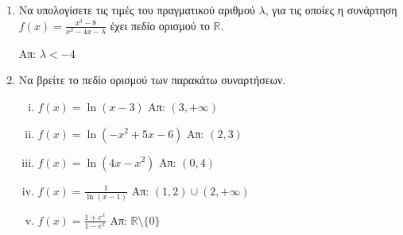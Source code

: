 \documentclass[a4paper,table]{report}
\begin{document}
\begin{enumerate}
    \twocolumnsidess{
      \begin{enumerate}[i)]
        \item $ f(x) = \sqrt{x-2} $ \hfill Απ: $[2,+\infty)$
        \item $ f(x) = \sqrt{4-x} -3x \sqrt{x+2} $ \hfill Απ: $ [-2,4] $ 
        \item $ f(x) = \sqrt{x^{2}-2x-3} $ \hfill Απ: $ (-\infty,-1] 
          \cup [3,+\infty) $  
        \item $ f(x) = \frac{\sqrt{x+3}}{x+1} $ \hfill Απ: 
          $ [-3,-1) \cup (-1,+\infty)  $ 
    \end{enumerate}}{
      \begin{enumerate}[i)]
        \item $ f(x) = \frac{\sqrt{x-2}}{\sqrt{x-3}} $ \hfill Απ:
          $ ( 3, +\infty ) $  
        \item $ f(x) = \frac{\sqrt{\abs{x}-2}}{x-3} $ \hfill 
          Απ: $ ( -\infty, -2 ] \cup [2,3) \cup (3,+\infty) $ 
        \item $ f(x) = \frac{\sqrt{\abs{x}-x}}{\abs{x}-2} $ \hfill Απ: 
          $ (-\infty,-2) \cup (-2,0] $
    \end{enumerate}
  }

    \item Να υπολογίσετε τις τιμές του πραγματικού αριθμού $ \lambda $, για τις 
      οποίες η συνάρτηση $ f(x) = \frac{x^{3}-8}{x^{2}-4x- \lambda} $ έχει πεδίο 
      ορισμού το $ \mathbb{R} $.

      \hfill Απ: $ \lambda < -4 $ 

    \item  Να βρείτε το πεδίο ορισμού των παρακάτω συναρτήσεων.
      \begin{enumerate}[i)]
        \item $ f(x) = \ln{(x-3)} $ \hfill Απ: $(3,+\infty)$
        \item $ f(x) = \ln{(-x^{2}+5x-6)} $ \hfill Απ: $ (2,3) $
        \item $ f(x) = \ln{(4x-x^{2})} $ \hfill Απ: $ (0,4) $
        \item $ f(x) = \frac{1}{\ln{(x-1)}} $ \hfill Απ: $ (1,2) \cup (2,+\infty) $ 
        \item $ f(x) = \frac{1+e^{x}}{1-e^{x}} $ \hfill Απ: 
          $ \mathbb{R} \setminus \{ 0 \} $ 
      \end{enumerate}
  \end{enumerate}
\end{document}
